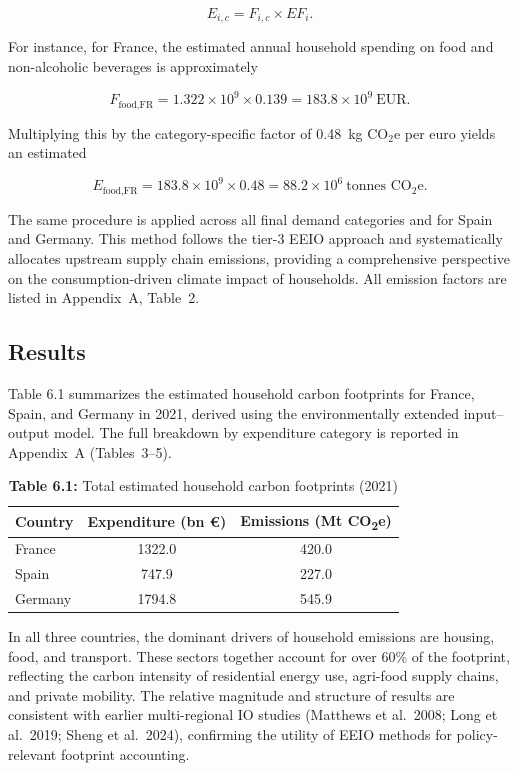 \documentclass[12pt,a4paper]{article}%
\begin{document}
\[
E_{i,c} = F_{i,c} \times EF_i.
\]

For instance, for France, the estimated annual household spending on food and non-alcoholic beverages is approximately

\[
F_{\text{food,FR}} = 1.322 \times 10^9 \times 0.139 = 183.8 \times 10^9~\text{EUR}.
\]

Multiplying this by the category-specific factor of 0.48~kg CO$_2$e per euro yields an estimated

\[
E_{\text{food,FR}} = 183.8 \times 10^9 \times 0.48 = 88.2 \times 10^6~\text{tonnes CO}_2\text{e}.
\]

The same procedure is applied across all final demand categories and for Spain and Germany. This method follows the tier-3 EEIO approach and systematically allocates upstream supply chain emissions, providing a comprehensive perspective on the consumption-driven climate impact of households. All emission factors are listed in Appendix~A, Table~2.

\subsection{Results}

Table 6.1 summarizes the estimated household carbon footprints for France, Spain, and Germany in 2021, derived using the environmentally extended input--output model. The full breakdown by expenditure category is reported in Appendix~A (Tables~3--5).

\begin{table}[h]
\centering
\caption*{\textbf{Table 6.1:} Total estimated household carbon footprints (2021)}
\begin{tabular}{lcc}
\toprule
\textbf{Country} & \textbf{Expenditure (bn €)} & \textbf{Emissions (Mt CO\textsubscript{2}e)} \\
\midrule
France & 1322.0 & 420.0 \\
Spain & 747.9 & 227.0 \\
Germany & 1794.8 & 545.9 \\
\bottomrule
\end{tabular}
\end{table}

In all three countries, the dominant drivers of household emissions are housing, food, and transport. These sectors together account for over 60\% of the footprint, reflecting the carbon intensity of residential energy use, agri-food supply chains, and private mobility. The relative magnitude and structure of results are consistent with earlier multi-regional IO studies (Matthews et al.~2008; Long et al.~2019; Sheng et al.~2024), confirming the utility of EEIO methods for policy-relevant footprint accounting.
\end{document}
